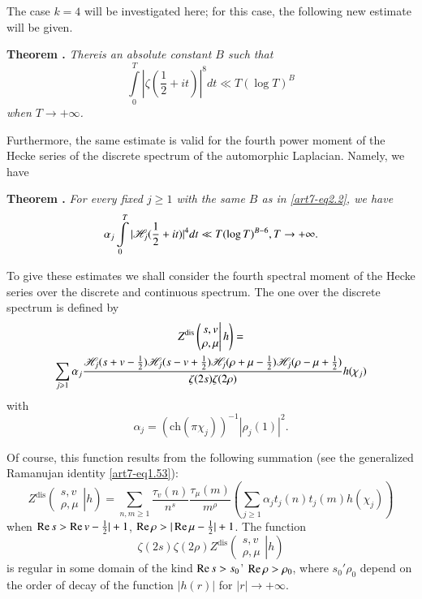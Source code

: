 The case $k=4$ will be investigated here; for this case, the following new estimate will be given. 

\medskip
\noindent
{\bfseries Theorem .\label{art7-thm12}}
\textit{There\pageoriginale is an absolute constant $B$ such that}
\begin{equation}
\int\limits^T_0 |\zeta (\frac{1}{2} + it)|^8 dt \ll T (\log T)^B \label{art7-eq2.2}
\end{equation}
\textit{when $T \to + \infty$.}

Furthermore, the same estimate is valid for the fourth power moment of the Hecke series of the discrete spectrum of the automorphic Laplacian. Namely, we have

\medskip
\noindent
{\bfseries Theorem  .\label{art7-thm13}}
\textit{For every fixed $j\geqslant 1$ with the same $B$ as in \eqref{art7-eq2.2}, we have }
\begin{equation}
\alpha_j \int\limits^T_0 |\mathscr{H}_j (\frac{1}{2} + it)|^4 dt  \ll T (\log T)^{B-6},T \to + \infty.  \label{art7-eq2.3}
\end{equation}

To give these estimates we shall consider the fourth spectral moment of the Hecke series over the discrete and continuous spectrum. The one over the discrete spectrum is defined by 
\begin{gather}
Z^{\text{dis}} 
\left(
\left.
\begin{matrix}
s, v\\
\rho, \mu
\end{matrix}
\right| h
\right) = 
\label{art7-eq2.4}\\
\sum\limits_{j \geqslant 1} \alpha_j \frac{\mathscr{H}_j (s+v -\frac{1}{2}) \mathscr{H}_j (s- v + \frac{1}{2}) \mathscr{H}_j (\rho + \mu - \frac{1}{2}) \mathscr{H}_j(\rho -\mu +\frac{1}{2}) }{\zeta(2s) \zeta(2\rho)} h(\chi_j) \notag
\end{gather}
with
\begin{equation}
\alpha_j = (\text{ch} (\pi \chi_j))^{-1} |\rho_j(1)|^2. \label{art7-eq2.5}
\end{equation}

Of course, this function results from the following summation (see the generalized Ramanujan identity \eqref{art7-eq1.53}):
\begin{equation}
Z^{\text{dis}} 
\left(
\left.
\begin{matrix}
s, v\\
\rho, \mu
\end{matrix}
\right| h
\right)  = \sum\limits_{n, m \geqslant 1} \frac{\tau_v (n)}{n^s} \frac{\tau_\mu(m)}{m^\rho} \left(\sum\limits_{j \geqslant 1} \alpha_j t_j (n) t_j (m) h(\chi_j) \right)
\label{art7-eq2.6}
\end{equation}
when $\operatorname{Re} s > \operatorname{Re} v -\frac{1}{2}| +1$, $\operatorname{Re} \rho > |\operatorname{Re} \mu - \frac{1}{2}| + 1$. The function 
$$
\zeta(2s) \zeta(2 \rho) Z^{\text{dis}}
\left(
\left.
\begin{matrix}
s, v\\
\rho, \mu
\end{matrix}
\right| h
\right) 
$$
is regular in some domain of the kind $\operatorname{Re} s > s_0$' $\operatorname{Re} \rho > \rho_0$, where $s_0' \rho_0$ depend on the order of decay of the function $|h(r)|$ for $|r| \to + \infty$. 

